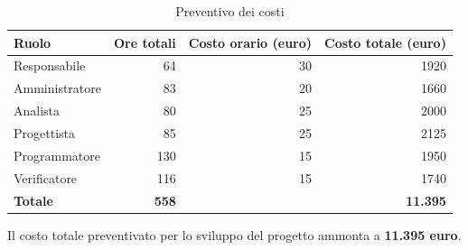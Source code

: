 \documentclass[11pt,a4paper]{article}
\begin{document}
\begin{table}[H]
    \centering
    \begin{tabular}{|l|r|r|r|}
        \hline
        \textbf{Ruolo} & \textbf{Ore totali} & \textbf{Costo orario (euro)} & \textbf{Costo totale (euro)} \\
        \hline
        Responsabile & 64 & 30 & 1920 \\
        \hline
        Amministratore & 83 & 20 & 1660 \\
        \hline
        Analista & 80 & 25 & 2000 \\
        \hline
        Progettista & 85 & 25 & 2125 \\
        \hline
        Programmatore & 130 & 15 & 1950 \\
        \hline
        Verificatore & 116 & 15 & 1740 \\
        \hline
        \textbf{Totale} & \textbf{558} & & \textbf{11.395} \\
        \hline
    \end{tabular}
    \caption{Preventivo dei costi}
    \label{tab:preventivo_costi}
\end{table}

Il costo totale preventivato per lo sviluppo del progetto ammonta a \textbf{11.395 euro}.
\end{document}
